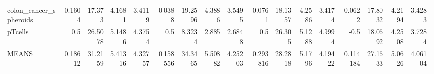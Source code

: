 \begin{tabular}{lrrrrrrrrrrrrrrrr}
 colon\_cancer\_spheroids                      &               0.1604  &          17.373  &           4.1681  &          3.4119  &         0.0388   &     19.2596 &      4.3886  &     3.5495  &       0.0761   &   18.1357 &     4.2586 &   3.4174  &         0.0622   &     17.8032 &       4.2194 &     3.4283  \\
 pTcells                                     &               0.5     &          26.5078 &           5.1486  &          4.3754  &         0.5      &      8.3234 &      2.885   &     2.6848  &       0.5      &   26.305  &     5.1288 &   4.9994  &        -0.5      &     18.0692 &       4.2508 &     3.7284  \\
 MEANS                                       &               0.18612 &          31.2159 &           5.41316 &          4.32757 &         0.158556 &     34.3465 &      5.50882 &     4.25203 &       0.293816 &   28.2818 &     5.1796 &   4.19422 &         0.114184 &     27.1633 &       5.0626 &     4.06104 \\
\hline
\end{tabular}